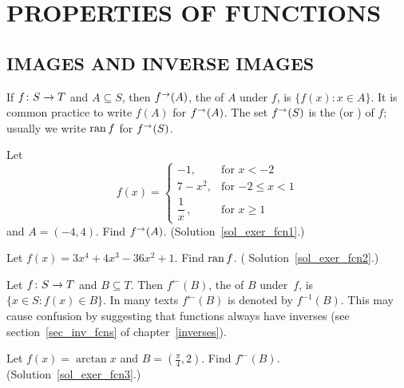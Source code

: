 \chapter{PROPERTIES OF FUNCTIONS}\label{images}

\section{IMAGES AND INVERSE IMAGES}
\begin{defn} If $f\colon S \rightarrow T$ and $A \subseteq S$, then $f^{\rightarrow} (A)$, the
 of $A$ under $f$, is $\{f(x)\colon x \in A\}$. It is common practice to write
$f(A)$ for $f^{\rightarrow}(A)$.  The set $f^{\rightarrow}(S)$ is the
 (or
) of $f$; usually we write $\operatorname{ran} f$ for $f^{\rightarrow}(S)$.
\end{defn}

\begin{exer}\label{exer_fcn1} Let
 \[ f(x) =
       \begin{cases} -1, &\text{for $x<-2$}\\
                7 - x^2, &\text{for $-2 \le x < 1$}\\
             \dfrac1x\,, &\text{for $x \ge 1$}
       \end{cases}\]
and $A = (-4,4)$.  Find $f^{\rightarrow}(A)$. (Solution~\ref{sol_exer_fcn1}.)
\end{exer}

\begin{exer}\label{exer_fcn2} Let $f(x) = 3x^4 + 4x^3 - 36x^2 + 1$.  Find $\operatorname{ran} f$. (
Solution~\ref{sol_exer_fcn2}.)
\end{exer}

\begin{defn}  Let $f\colon S \rightarrow T$ and $B \subseteq T$. Then
$f^\gets (B)$, the
 of $B$ under~$f$, is $\{x \in S\colon f(x) \in B\}$. In many texts
$f^{\gets}(B)$ is denoted by $f^{-1}(B)$. This may cause confusion by suggesting that
functions always have inverses (see section~\ref{sec_inv_fcns} of chapter~\ref{inverses}).
\end{defn}

\begin{exer}\label{exer_fcn3}  Let $f(x) = \arctan x$ and $B = (\frac\pi4, 2)$. Find
$f^{\gets}(B)$. (Solution~\ref{sol_exer_fcn3}.)
\end{exer}

